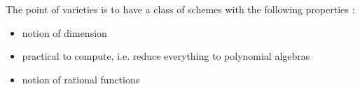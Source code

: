 \documentclass[./main.tex]{subfiles}
\begin{document}
The point of varieties is to have a class of
schemes with the following properties :
\begin{itemize}
  \item notion of dimension
  \item practical to compute, 
  i.e. reduce everything to polynomial algebras
  \item notion of rational functions
\end{itemize}
\end{document}
